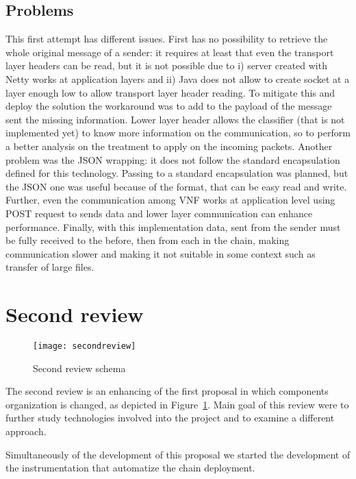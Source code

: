 \subsection{Problems}
This first attempt has different issues. First \enchainer{} has no
possibility to retrieve the whole original message of a sender: it requires at
least that even the transport layer headers can be read, but it is not possible
due to i) server created with Netty works at application layers and ii) Java
does not allow to create socket at a layer enough low to allow transport
layer header reading. To mitigate this and deploy the solution the workaround
was to add to the payload of the message sent the missing information. Lower
layer header allows the classifier (that is not implemented yet) to know more
information on the communication, so to perform a better analysis on the
treatment to apply on the incoming packets. Another problem was the JSON
wrapping: it does not follow the standard encapsulation defined for this
technology. Passing to a standard encapsulation was planned, but the JSON one
was useful because of the format, that can be easy read and write. Further, even
the communication among VNF works at application level using POST request to
sends data and lower layer communication can enhance performance. Finally, with
this implementation data, sent from the sender must be fully received to the 
\enchainer{} before, then from each \vnf{} in the chain, making communication
slower and making it not suitable in some context such as transfer of large
files.

\section{Second review}
\begin{figure}
  \centering
  \texttt{[image: secondreview]}
  \caption{Second review schema}
  \label{chap:impl:img:secondreview}
\end{figure}
The second review is an enhancing of the first proposal in which components
organization is changed, as depicted in Figure~\ref{chap:impl:img:secondreview}.
Main goal of this review were to further study technologies involved into the
project and to examine a different approach.

Simultaneously of the development of this proposal we started the development of
the instrumentation that automatize the chain deployment.


